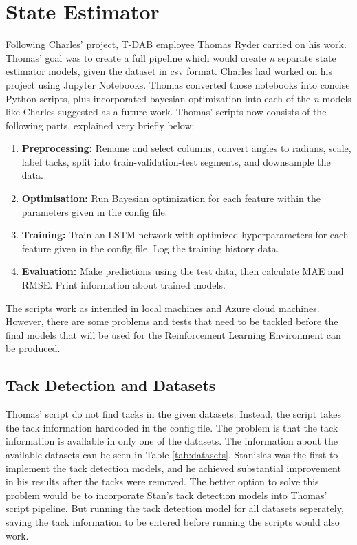 \section{State Estimator} \label{sec:state-estimator}

Following Charles' project, T-DAB employee Thomas Ryder carried on his work. Thomas' goal was to create a full pipeline which would create \emph{n} separate state estimator models, given the dataset in csv format.  Charles had worked on his project using Jupyter Notebooks. Thomas converted those notebooks into concise Python scripts, plus incorporated bayesian optimization into each of the \emph{n} models like Charles suggested as a future work. Thomas' scripts now consists of the following parts, explained very briefly below:

\begin{enumerate}
  \item \textbf{Preprocessing:} Rename and select columns, convert angles to radians, scale, label tacks, split into train-validation-test segments, and downsample the data.
  \item \textbf{Optimisation:} Run Bayesian optimization for each feature within the parameters given in the config file.
  \item \textbf{Training:} Train an LSTM network with optimized hyperparameters for each feature given in the config file. Log the training history data.
  \item \textbf{Evaluation:} Make predictions using the test data, then calculate MAE and RMSE. Print information about trained models.
\end{enumerate}

The scripts work as intended in local machines and Azure cloud machines. However, there are some problems and tests that need to be tackled before the final models that will be used for the Reinforcement Learning Environment can be produced. 

\subsection{Tack Detection and Datasets} \label{subsec:tack-detection-and-datasets}

Thomas' script do not find tacks in the given datasets. Instead, the script takes the tack information hardcoded in the config file. The problem is that the tack information is available in only one of the datasets. The information about the available datasets can be seen in Table \ref{tab:datasets}. Stanislas was the first to implement the tack detection models, and he achieved substantial improvement in his results after the tacks were removed. The better option to solve this problem would be to incorporate Stan's tack detection models into Thomas' script pipeline. But running the tack detection model for all datasets seperately, saving the tack information to be entered before running the scripts would also work.

